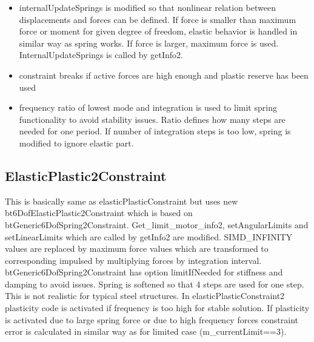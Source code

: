 \begin{itemize}
\item internalUpdateSprings is modified so that nonlinear relation between displacements and forces can be defined. 
 If force is smaller than maximum force or moment for given degree of freedom,
  elastic behavior is handled in similar way as spring works. 
  If force is larger, maximum force is used. InternalUpdateSprings is called by getInfo2.
\item constraint breaks if active forces are high enough and plastic reserve has been used
\item frequency ratio of lowest mode and integration is used to limit spring functionality to avoid stability issues. 
 Ratio defines how many steps are needed for one period. 
 If number of integration steps is too low, spring is modified to ignore elastic part.
\end{itemize}


\subsection{ElasticPlastic2Constraint}
This is basically same as elasticPlasticConstraint but uses new bt6DofElasticPlastic2Constraint 
which is based on btGeneric6DofSpring2Constraint.
Get\_limit\_motor\_info2, setAngularLimits and setLinearLimits which are called by getInfo2 are modified. 
SIMD\_INFINITY values are replaced by maximum force values which are transformed to
corresponding impulsed by multiplying forces by integration interval.
btGeneric6DofSpring2Constraint has option limitIfNeeded for stiffness and damping to avoid issues. 
Spring is softened so that 4 steps are used for one step. This is not realistic for typical steel structures. 
In elasticPlasticConstraint2 plasticity code is activated if frequency is too high for stable solution.
If plasticity is activated due to large spring force or due to high frequency forces constraint error is 
calculated in similar way as for limited case (m\_currentLimit==3).

\cleardoublepage
